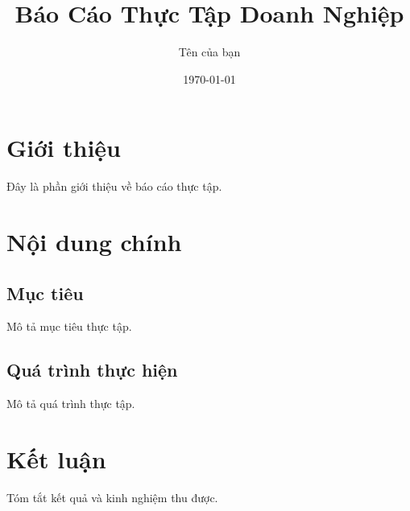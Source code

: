 \documentclass[12pt,a4paper]{article}
\title{Báo Cáo Thực Tập Doanh Nghiệp}
\author{Tên của bạn}
\date{\today}
\begin{document}
\maketitle

\tableofcontents
\newpage

\section{Giới thiệu}
Đây là phần giới thiệu về báo cáo thực tập.

\section{Nội dung chính}
\subsection{Mục tiêu}
Mô tả mục tiêu thực tập.

\subsection{Quá trình thực hiện}
Mô tả quá trình thực tập.

\section{Kết luận}
Tóm tắt kết quả và kinh nghiệm thu được.
\end{document}

